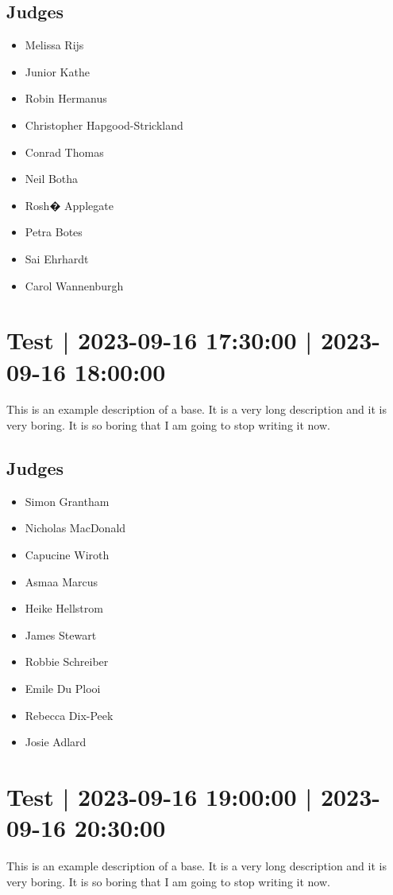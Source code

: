 \documentclass[10pt]{article}
\begin{document}
	\subsection*{Judges}
	\begin{itemize}

			\item Melissa Rijs
			\item Junior Kathe
			\item Robin Hermanus
			\item Christopher Hapgood-Strickland
			\item Conrad Thomas
			\item Neil Botha
			\item Rosh� Applegate
			\item Petra Botes
			\item Sai Ehrhardt
			\item Carol Wannenburgh
		\end{itemize}

			\setcounter{section}{20}
	\section{Test | 2023-09-16 17:30:00 | 2023-09-16 18:00:00}
	This is an example description of a base. It is a very long description and it is very boring. It is so boring that I am going to stop writing it now.

	\subsection*{Judges}
	\begin{itemize}

			\item Simon Grantham
			\item Nicholas MacDonald
			\item Capucine Wiroth
			\item Asmaa Marcus
			\item Heike Hellstrom
			\item James Stewart
			\item Robbie Schreiber
			\item Emile Du Plooi
			\item Rebecca Dix-Peek
			\item Josie Adlard
		\end{itemize}

			\setcounter{section}{21}
	\section{Test | 2023-09-16 19:00:00 | 2023-09-16 20:30:00}
	This is an example description of a base. It is a very long description and it is very boring. It is so boring that I am going to stop writing it now.
\end{document}
